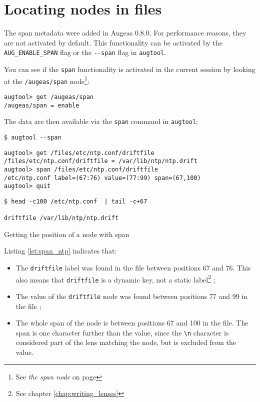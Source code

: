 \section{Locating nodes in files}

\label{sec:locating_nodes}  

The span metadata were added in Augeas 0.8.0. For performance reasons, they are not activated by default. This functionality can be activated by the \verb!AUG_ENABLE_SPAN! flag or the \verb!--span! flag in \verb!augtool!.

You can see if the \verb!span! functionality is activated in the current session by looking at the \verb!/augeas/span! node\footnote{See \emph{the span node} on page \pageref{sec:span_node}}:


\begin{verbatim}
augtool> get /augeas/span
/augeas/span = enable
\end{verbatim}

The data are then available via the \verb!span! command in \verb!augtool!:


\begin{listing}
  \begin{verbatim}
$ augtool --span
  \end{verbatim}
  \begin{verbatim}
augtool> get /files/etc/ntp.conf/driftfile
/files/etc/ntp.conf/driftfile = /var/lib/ntp/ntp.drift
augtool> span /files/etc/ntp.conf/driftfile
/etc/ntp.conf label=(67:76) value=(77:99) span=(67,100)
augtool> quit
  \end{verbatim}
  \begin{verbatim}
$ head -c100 /etc/ntp.conf  | tail -c+67

driftfile /var/lib/ntp/ntp.drift
  \end{verbatim}
  \label{lst:span_ntp}
  \caption{Getting the position of a node with span}
\end{listing}

Listing \ref{lst:span_ntp} indicates that:

\begin{itemize}
\item
  The \verb!driftfile! label was found in the file between positions 67 and 76. This also means that \verb!driftfile! is a dynamic key, not a static label\footnote{See chapter \ref{chap:writing_lenses}} ;
\item
  The value of the \verb!driftfile! node was found between positions 77 and 99 in the file ;
\item
  The whole span of the node is between positions 67 and 100 in the file. The span is one character further than the value, since the \verb!\n! character is considered part of the lens matching the node, but is excluded from the value.
\end{itemize}
